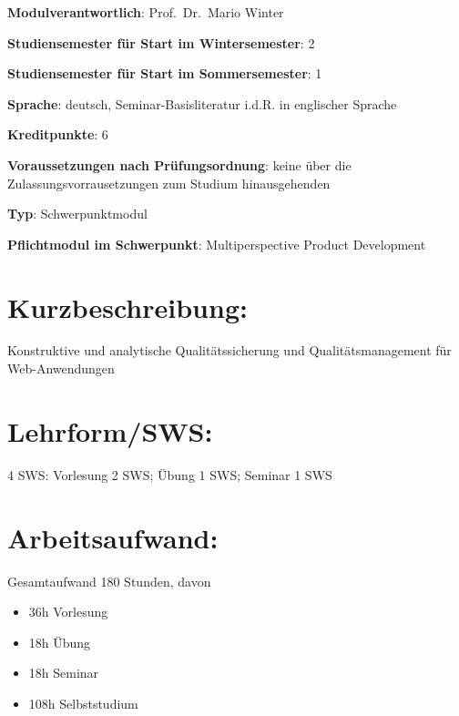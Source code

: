 \begin{modulHead}
\textbf{Modulverantwortlich}: Prof.~Dr.~Mario
Winter
\end{modulHead}
\begin{modulHead}
\textbf{Studiensemester für
Start im Wintersemester}:
2
\end{modulHead}
\begin{modulHead}
\textbf{Studiensemester für Start
im Sommersemester}:
1
\end{modulHead}
\begin{modulHead}
\textbf{Sprache}: deutsch,
Seminar-Basisliteratur i.d.R. in englischer
Sprache
\end{modulHead}
\begin{modulHead}
\textbf{Kreditpunkte}:
6
\end{modulHead}
\begin{modulHead}
\textbf{Voraussetzungen nach
Prüfungsordnung}: keine über die Zulassungsvorrausetzungen zum Studium
hinausgehenden
\end{modulHead}
\begin{modulHead}
\textbf{Typ}:
Schwerpunktmodul
\end{modulHead}
\begin{modulHead}
\textbf{Pflichtmodul
im Schwerpunkt}: Multiperspective Product Development
\end{modulHead}


\section*{Kurzbeschreibung:}\label{kurzbeschreibung-13}

Konstruktive und analytische Qualitätssicherung und Qualitätsmanagement
für Web-Anwendungen

\section*{Lehrform/SWS:}\label{lehrformsws-21}

4 SWS: Vorlesung 2 SWS; Übung 1 SWS; Seminar 1 SWS

\section*{Arbeitsaufwand:}\label{arbeitsaufwand-22}

Gesamtaufwand 180 Stunden, davon

\begin{itemize}
\tightlist
\item
  36h Vorlesung
\item
  18h Übung
\item
  18h Seminar
\item
  108h Selbststudium
\end{itemize}

